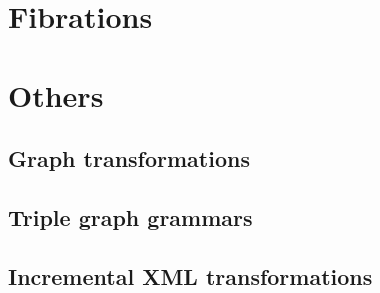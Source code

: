 \section{Fibrations}
\label{sec:fibrations}
%

\section{Others}
\label{sec:other-related-work}

\subsection{Graph transformations}
\label{sec:other-related-work:graph}

\subsection{Triple graph grammars}
\label{sec:other-related-work:triple}

\subsection{Incremental XML transformations}
\label{sec:other-related-work:xml}

